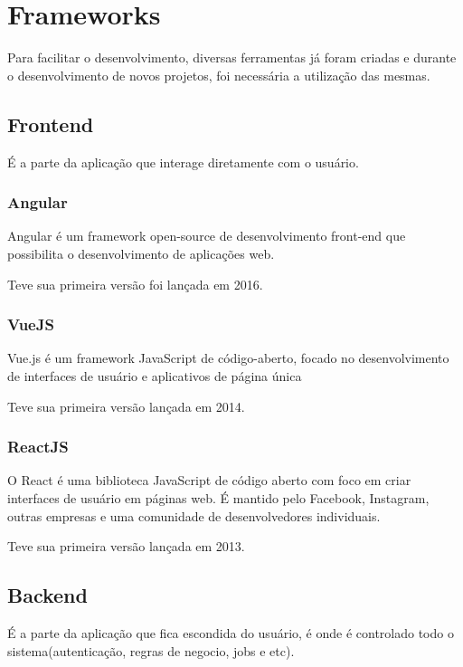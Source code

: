 \section{Frameworks}

Para facilitar o desenvolvimento, diversas ferramentas já foram criadas e durante o desenvolvimento de novos projetos, foi necessária a utilização das mesmas.

\subsection{Frontend}

É a parte da aplicação que interage diretamente com o usuário.

\subsubsection{Angular}

Angular é um framework open-source de desenvolvimento front-end que possibilita o desenvolvimento de aplicações web.

Teve sua primeira versão foi lançada em 2016.

\subsubsection{VueJS}

Vue.js é um framework JavaScript de código-aberto, focado no desenvolvimento de interfaces de usuário e aplicativos de página única

Teve sua primeira versão lançada em 2014.

\subsubsection{ReactJS}

O React é uma biblioteca JavaScript de código aberto com foco em criar interfaces de usuário em páginas web. É mantido pelo Facebook, Instagram, outras empresas e uma comunidade de desenvolvedores individuais. 

Teve sua primeira versão lançada em 2013.

\subsection{Backend}

É a parte da aplicação que fica escondida do usuário, é onde é controlado todo o sistema(autenticação, regras de negocio, jobs e etc).

